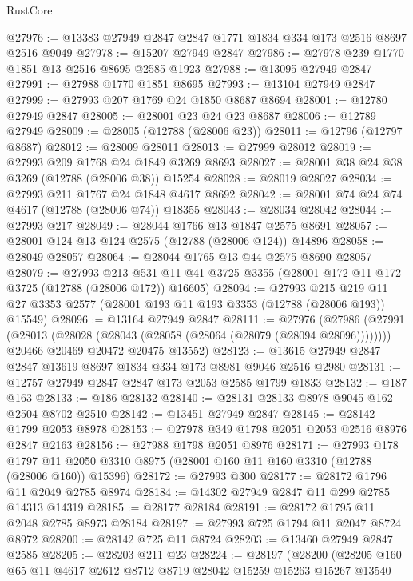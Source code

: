 \begin{lexlean}{RustCore}
\begin{coremodule}
@27976 := @13383 @27949 @2847 @2847 @1771 @1834 @334 @173 @2516 @8697 @2516 @9049
@27978 := @15207 @27949 @2847
@27986 := @27978 @239 @1770 @1851 @13 @2516 @8695 @2585 @1923
@27988 := @13095 @27949 @2847
@27991 := @27988 @1770 @1851 @8695
@27993 := @13104 @27949 @2847
@27999 := @27993 @207 @1769 @24 @1850 @8687 @8694
@28001 := @12780 @27949 @2847
@28005 := @28001 @23 @24 @23 @8687
@28006 := @12789 @27949
@28009 := @28005 (@12788 (@28006 @23))
@28011 := @12796 (@12797 @8687)
@28012 := @28009 @28011
@28013 := @27999 @28012
@28019 := @27993 @209 @1768 @24 @1849 @3269 @8693
@28027 := @28001 @38 @24 @38 @3269 (@12788 (@28006 @38)) @15254
@28028 := @28019 @28027
@28034 := @27993 @211 @1767 @24 @1848 @4617 @8692
@28042 := @28001 @74 @24 @74 @4617 (@12788 (@28006 @74)) @18355
@28043 := @28034 @28042
@28044 := @27993 @217
@28049 := @28044 @1766 @13 @1847 @2575 @8691
@28057 := @28001 @124 @13 @124 @2575 (@12788 (@28006 @124)) @14896
@28058 := @28049 @28057
@28064 := @28044 @1765 @13 @44 @2575 @8690 @28057
@28079 := @27993
    @213
    @531
    @11
    @41
    @3725
    @3355
    (@28001 @172 @11 @172 @3725 (@12788 (@28006 @172)) @16605)
@28094 := @27993
    @215
    @219
    @11
    @27
    @3353
    @2577
    (@28001 @193 @11 @193 @3353 (@12788 (@28006 @193)) @15549)
@28096 := @13164 @27949 @2847
@28111 := @27976
    (@27986
      (@27991 (@28013 (@28028 (@28043 (@28058 (@28064 (@28079 (@28094 @28096))))))))
      @20466
      @20469
      @20472
      @20475
      @13552)
@28123 := @13615 @27949 @2847 @2847 @13619 @8697 @1834 @334 @173 @8981 @9046 @2516 @2980
@28131 := @12757 @27949 @2847 @2847 @173 @2053 @2585 @1799 @1833
@28132 := @187 @163
@28133 := @186 @28132
@28140 := @28131 @28133 @8978 @9045 @162 @2504 @8702 @2510
@28142 := @13451 @27949 @2847
@28145 := @28142 @1799 @2053 @8978
@28153 := @27978 @349 @1798 @2051 @2053 @2516 @8976 @2847 @2163
@28156 := @27988 @1798 @2051 @8976
@28171 := @27993
    @178
    @1797
    @11
    @2050
    @3310
    @8975
    (@28001 @160 @11 @160 @3310 (@12788 (@28006 @160)) @15396)
@28172 := @27993 @300
@28177 := @28172 @1796 @11 @2049 @2785 @8974
@28184 := @14302 @27949 @2847 @11 @299 @2785 @14313 @14319
@28185 := @28177 @28184
@28191 := @28172 @1795 @11 @2048 @2785 @8973 @28184
@28197 := @27993 @725 @1794 @11 @2047 @8724 @8972
@28200 := @28142 @725 @11 @8724
@28203 := @13460 @27949 @2847 @2585
@28205 := @28203 @211 @23
@28224 := @28197
    (@28200
      (@28205
        @160
        @65
        @11
        @4617
        @2612
        @8712
        @8719
        @28042
        @15259
        @15263
        @15267
        @13540

\end{coremodule}
\end{lexlean}
